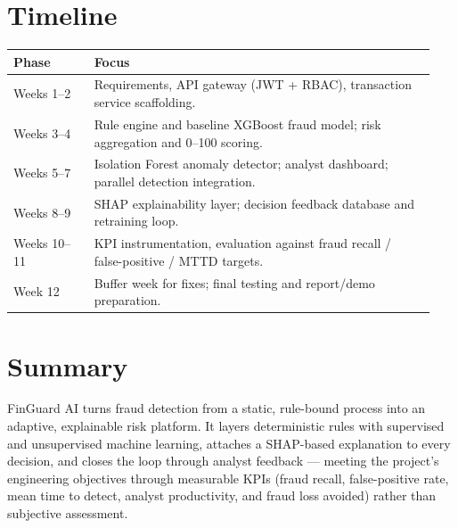 \documentclass[11pt,letterpaper]{article}
\begin{document}
\section{Timeline}
\begin{center}
\small
\begin{tabular}{@{}L{0.18\linewidth} L{0.76\linewidth}@{}}
\toprule
\textbf{Phase} & \textbf{Focus} \\
\midrule
Weeks 1--2 & Requirements, API gateway (JWT + RBAC), transaction service scaffolding. \\
Weeks 3--4 & Rule engine and baseline XGBoost fraud model; risk aggregation and 0--100 scoring. \\
Weeks 5--7 & Isolation Forest anomaly detector; analyst dashboard; parallel detection integration. \\
Weeks 8--9 & SHAP explainability layer; decision feedback database and retraining loop. \\
Weeks 10--11 & KPI instrumentation, evaluation against fraud recall / false-positive / MTTD targets. \\
Week 12 & Buffer week for fixes; final testing and report/demo preparation. \\
\bottomrule
\end{tabular}
\end{center}

\section{Summary}
FinGuard AI turns fraud detection from a static, rule-bound process into an adaptive, explainable risk platform. It layers deterministic rules with supervised and unsupervised machine learning, attaches a SHAP-based explanation to every decision, and closes the loop through analyst feedback --- meeting the project's engineering objectives through measurable KPIs (fraud recall, false-positive rate, mean time to detect, analyst productivity, and fraud loss avoided) rather than subjective assessment.
\end{document}
